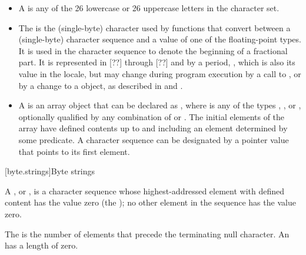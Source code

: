 \documentclass{wg21}
\begin{document}
\begin{itemize}
    \item
    A  is any of the 26 lowercase or 26
    uppercase letters in the  character set.
    \item
    The
    is the
    (single-byte) character used by functions that convert between a (single-byte)
    character sequence and a value of one of the floating-point types.
    It is used
    in the character sequence to denote the beginning of a fractional part.
    It is
    represented in [??] through  [??]
    and  by a period,
    ,
    which is
    also its value in the 
    locale, but may change during program
    execution by a call to
    ,
    or by a change to a
    object, as described in  and .
    \item
    A
    is an array object  that
    can be declared as
    ,
    where  is any of the types
    ,
    ,
    or
    , optionally qualified by any combination of
    or
    .
    The initial elements of the
    array have defined contents up to and including an element determined by some
    predicate.
    A character sequence can be designated by a pointer value
     that points to its first element.
\end{itemize}

[byte.strings]{Byte strings}

%
\pnum
A ,
or \ntbs{},
is a character sequence whose highest-addressed element
with defined content has the value zero
(the );
no other element in the sequence has the value zero.

\pnum
The 
is the number of elements that
precede the terminating null character.
An 
has a length of zero.
\end{document}
